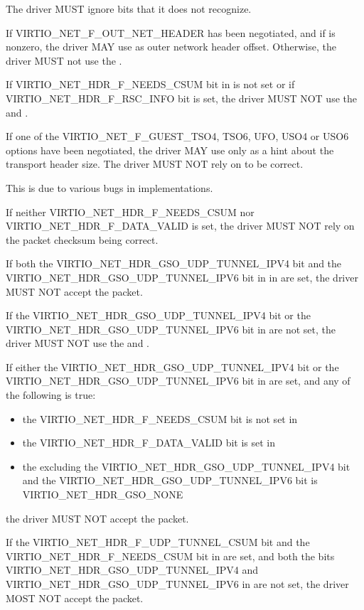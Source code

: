 The driver MUST ignore  bits that it does not recognize.

If VIRTIO_NET_F_OUT_NET_HEADER has been negotiated, and if 
is nonzero, the driver MAY use  as outer network header
offset. Otherwise, the driver MUST not use the .

If VIRTIO_NET_HDR_F_NEEDS_CSUM bit in  is not set or
if VIRTIO_NET_HDR_F_RSC_INFO bit  is set, the
driver MUST NOT use the  and .

If one of the VIRTIO_NET_F_GUEST_TSO4, TSO6, UFO, USO4 or USO6 options have
been negotiated, the driver MAY use  only as a hint about the
transport header size.
The driver MUST NOT rely on  to be correct.
\begin{note}
This is due to various bugs in implementations.
\end{note}

If neither VIRTIO_NET_HDR_F_NEEDS_CSUM nor
VIRTIO_NET_HDR_F_DATA_VALID is set, the driver MUST NOT
rely on the packet checksum being correct.

If both the VIRTIO_NET_HDR_GSO_UDP_TUNNEL_IPV4 bit and
the VIRTIO_NET_HDR_GSO_UDP_TUNNEL_IPV6 bit in in  are set,
the driver MUST NOT accept the packet.

If the VIRTIO_NET_HDR_GSO_UDP_TUNNEL_IPV4 bit or the VIRTIO_NET_HDR_GSO_UDP_TUNNEL_IPV6
bit in  are not set, the driver MUST NOT use the
 and .

If either the VIRTIO_NET_HDR_GSO_UDP_TUNNEL_IPV4 bit or
the VIRTIO_NET_HDR_GSO_UDP_TUNNEL_IPV6 bit in  are set, and any of
the following is true:
\begin{itemize}
\item the VIRTIO_NET_HDR_F_NEEDS_CSUM bit is not set in 
\item the VIRTIO_NET_HDR_F_DATA_VALID bit is set in 
\item the  excluding the VIRTIO_NET_HDR_GSO_UDP_TUNNEL_IPV4
bit and the VIRTIO_NET_HDR_GSO_UDP_TUNNEL_IPV6 bit is VIRTIO_NET_HDR_GSO_NONE
\end{itemize}
the driver MUST NOT accept the packet.

If the VIRTIO_NET_HDR_F_UDP_TUNNEL_CSUM bit and the VIRTIO_NET_HDR_F_NEEDS_CSUM
bit in  are set,
and both the bits VIRTIO_NET_HDR_GSO_UDP_TUNNEL_IPV4 and
VIRTIO_NET_HDR_GSO_UDP_TUNNEL_IPV6 in  are not set,
the driver MOST NOT accept the packet.


